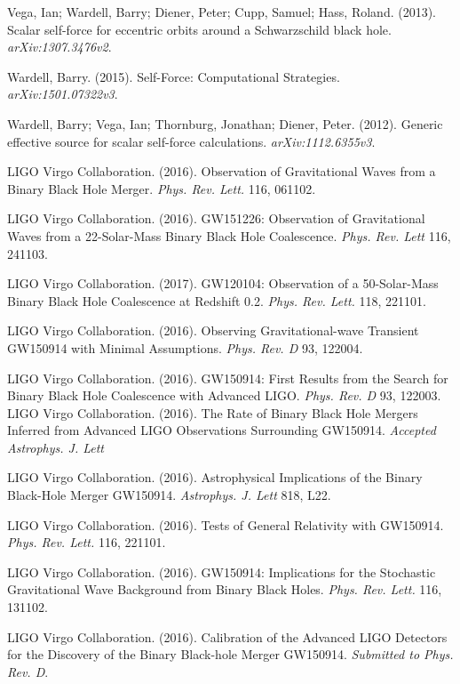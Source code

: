 Vega, Ian; Wardell, Barry; Diener, Peter; Cupp, Samuel; Hass, Roland. (2013). Scalar self-force for eccentric orbits around a Schwarzschild black hole. {\em arXiv:1307.3476v2}.

Wardell, Barry. (2015). Self-Force: Computational Strategies. {\em arXiv:1501.07322v3}.

Wardell, Barry; Vega, Ian; Thornburg, Jonathan; Diener, Peter. (2012). Generic effective source for scalar self-force calculations. {\em arXiv:1112.6355v3}.



LIGO Virgo Collaboration. (2016). Observation of Gravitational Waves from a Binary Black Hole Merger. {\em Phys. Rev. Lett.} 116, 061102.

LIGO Virgo Collaboration. (2016). GW151226: Observation of Gravitational Waves from a 22-Solar-Mass Binary Black Hole Coalescence. {\em Phys. Rev. Lett} 116, 241103.
  
  LIGO Virgo Collaboration. (2017). GW120104: Observation of a 50-Solar-Mass Binary Black Hole Coalescence at Redshift 0.2. {\em Phys. Rev. Lett.} 118, 221101.

  LIGO Virgo Collaboration. (2016). Observing Gravitational-wave Transient GW150914 with Minimal Assumptions. {\em Phys. Rev. D} 93, 122004.

  LIGO Virgo Collaboration. (2016). GW150914: First Results from the Search for Binary Black Hole Coalescence with Advanced LIGO. {\em Phys. Rev. D} 93, 122003.
  LIGO Virgo Collaboration. (2016). The Rate of Binary Black Hole Mergers Inferred from Advanced LIGO Observations Surrounding GW150914. {\em Accepted Astrophys. J. Lett}

  LIGO Virgo Collaboration. (2016). Astrophysical Implications of the Binary Black-Hole Merger GW150914. {\em Astrophys. J. Lett} 818, L22.

  LIGO Virgo Collaboration. (2016). Tests of General Relativity with GW150914. {\em Phys. Rev. Lett.} 116, 221101.
  
  LIGO Virgo Collaboration. (2016). GW150914: Implications for the Stochastic Gravitational Wave Background from Binary Black Holes. {\em Phys. Rev. Lett.} 116, 131102.

  LIGO Virgo Collaboration. (2016). Calibration of the Advanced LIGO Detectors for the Discovery of the Binary Black-hole Merger GW150914. {\em Submitted to Phys. Rev. D}.

